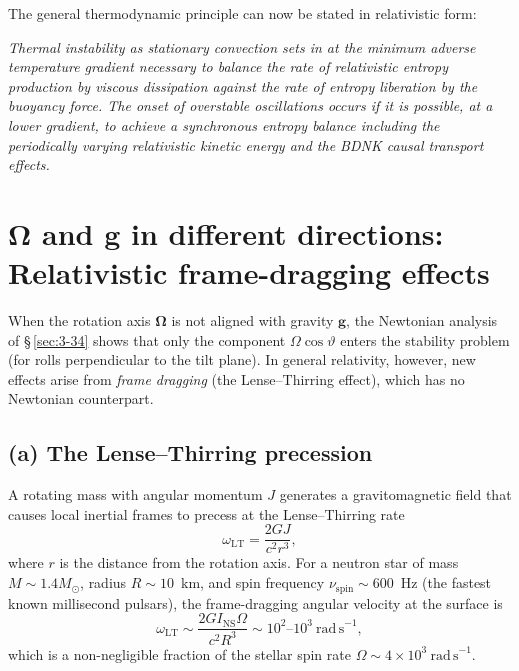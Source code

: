 The general thermodynamic principle can now be stated in relativistic
form:

\emph{Thermal instability as stationary convection sets in at the
minimum adverse temperature gradient necessary to balance the rate of
relativistic entropy production by viscous dissipation against the rate
of entropy liberation by the buoyancy force.  The onset of overstable
oscillations occurs if it is possible, at a lower gradient, to achieve
a synchronous entropy balance including the periodically varying
relativistic kinetic energy and the BDNK causal transport
effects.}


\section{\texorpdfstring{$\boldsymbol{\Omega}$ and $\mathbf{g}$}{Omega and g} in different directions:
Relativistic frame-dragging effects}\label{sec:rel-3-34}

When the rotation axis $\boldsymbol{\Omega}$ is not aligned with
gravity $\mathbf{g}$, the Newtonian analysis of \S\,\ref{sec:3-34}
shows that only the component $\Omega\cos\vartheta$ enters the stability
problem (for rolls perpendicular to the tilt plane).  In general
relativity, however, new effects arise from \emph{frame dragging}
(the Lense--Thirring effect), which has no Newtonian counterpart.

\subsection*{(a) The Lense--Thirring precession}

A rotating mass with angular momentum $J$ generates a gravitomagnetic
field that causes local inertial frames to precess at the Lense--Thirring
rate
\begin{equation}\label{eq:rel-3-304}
  \omega_{\mathrm{LT}} = \frac{2GJ}{c^2 r^3},
\end{equation}
where $r$ is the distance from the rotation axis.  For a neutron star
of mass $M \sim 1.4 M_{\odot}$, radius $R \sim 10$~km, and spin
frequency $\nu_{\mathrm{spin}} \sim 600$~Hz (the fastest known
millisecond pulsars), the frame-dragging angular velocity at the
surface is
\begin{equation}\label{eq:rel-3-305}
  \omega_{\mathrm{LT}} \sim \frac{2G I_{\mathrm{NS}}\Omega}{c^2 R^3}
  \sim 10^2\text{--}10^3~\mathrm{rad\,s}^{-1},
\end{equation}
which is a non-negligible fraction of the stellar spin rate
$\Omega \sim 4 \times 10^3~\mathrm{rad\,s}^{-1}$.


